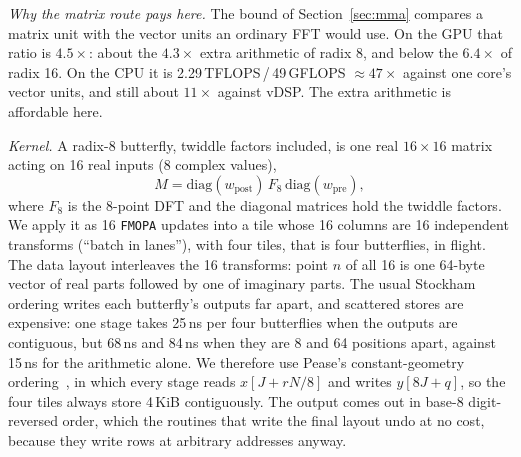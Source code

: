 \documentclass[conference]{IEEEtran}
\newcommand{\GF}{\,GFLOPS}
\begin{document}
\textit{Why the matrix route pays here.} The bound of Section~\ref{sec:mma} compares a matrix unit with
the vector units an ordinary FFT would use. On the GPU that ratio is $4.5\times$: about the $4.3\times$
extra arithmetic of radix 8, and below the $6.4\times$ of radix 16. On the CPU it is
2.29\,TFLOPS\,/\,49\GF{} $\approx47\times$ against one core's vector units, and still about $11\times$
against vDSP. The extra arithmetic is affordable here.

\textit{Kernel.} A radix-8 butterfly, twiddle factors included, is one real $16\times16$ matrix acting on
16 real inputs (8 complex values),
\begin{equation}
  M=\mathrm{diag}(w_\mathrm{post})\,F_8\,\mathrm{diag}(w_\mathrm{pre}),
\end{equation}
where $F_8$ is the 8-point DFT and the diagonal matrices hold the twiddle factors. We apply it as 16
\texttt{FMOPA} updates into a tile whose 16 columns are 16 independent transforms (``batch in lanes''),
with four tiles, that is four butterflies, in flight. The data layout interleaves the 16 transforms:
point $n$ of all 16 is one 64-byte vector of real parts followed by one of imaginary parts. The usual
Stockham ordering writes each butterfly's outputs far apart, and scattered stores are expensive: one
stage takes 25\,ns per four butterflies when the outputs are contiguous, but 68\,ns and 84\,ns when they
are 8 and 64 positions apart, against 15\,ns for the arithmetic alone. We therefore use Pease's
constant-geometry ordering~\cite{pease1968adaptation}, in which every stage reads $x[J+rN/8]$ and writes
$y[8J+q]$, so the four tiles always store 4\,KiB contiguously. The output comes out in base-8
digit-reversed order, which the routines that write the final layout undo at no cost, because they write
rows at arbitrary addresses anyway.
\end{document}
